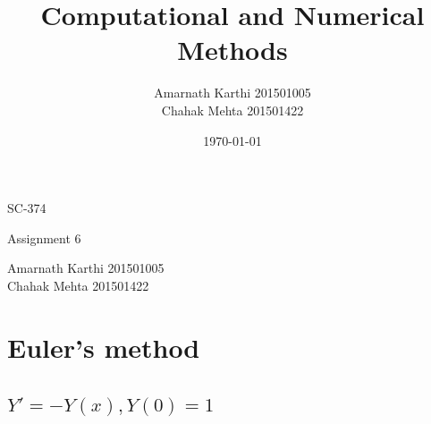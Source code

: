 \documentclass[12,a4paper]{article}
\title{Computational and Numerical Methods}
\date{\today}
\author{Amarnath Karthi  201501005 \\ Chahak Mehta  201501422}
\begin{document}
    \begin{titlepage}
	    \centering
	    {\scshape\LARGE SC-374 \par}
	    \vspace{0.1cm}
	    {\huge \@title \par}
	    \vspace{0.5cm}
	    {\Large Assignment 6\par}
	    \vspace{10cm}
	    \Large Amarnath Karthi          201501005\\
	    \Large Chahak Mehta             201501422\\
	    \vspace{5cm}
	    {\large \@date\par}
    \end{titlepage}
    
    \section{Euler's method}
    \subsection{$Y' = -Y(x), Y(0) = 1$}
\end{document}
